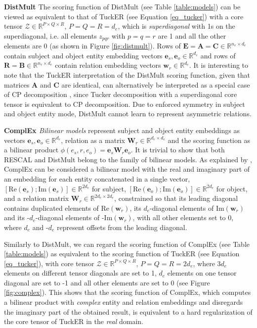 \documentclass[11pt,a4paper]{article}
\newcommand{\keypoint}[1]{\vspace{0.1cm}\noindent\textbf{#1}\quad}
\begin{document}
\keypoint{DistMult \cite{yang2014embedding}} The scoring function of DistMult (see Table \ref{table:models}) can be viewed as  equivalent to that of TuckER (see Equation \ref{eq_tucker}) with a core tensor $\mathcal{Z} \in \mathbb{R}^{P \times Q \times R}$, $P = Q = R = d_e$, which is \textit{superdiagonal} with 1s on the superdiagonal, i.e. all elements $z_{pqr}$ with $p=q=r$ are 1 and all the other elements are 0 (as shown in Figure \ref{fig:distmult}). Rows of $\mathbf{E} = \mathbf{A} = \mathbf{C} \in \mathbb{R}^{n_e \times d_e}$ contain subject and object entity embedding vectors $\mathbf{e}_s, \mathbf{e}_o \in \mathbb{R}^{d_e}$ and rows of $\mathbf{R} = \mathbf{B} \in \mathbb{R}^{n_r \times d_e}$ contain relation embedding vectors $\mathbf{w}_r \in \mathbb{R}^{d_e}$. It is interesting to note that the TuckER interpretation of the DistMult scoring function, given that matrices $\mathbf{A}$ and $\mathbf{C}$ are identical, can alternatively be interpreted as a special case of CP decomposition \cite{hitchcock1927expression}, since Tucker decomposition with a superdiagonal core tensor is equivalent to CP decomposition. Due to enforced symmetry in subject and object entity mode, DistMult cannot learn to represent asymmetric relations.

\keypoint{ComplEx \cite{trouillon2016complex}} \textit{Bilinear models} represent subject and object entity embeddings as vectors $\mathbf{e}_s, \mathbf{e}_o \in \mathbb{R}^{d_e}$, relation as a matrix $\mathbf{W}_r \in \mathbb{R}^{d_e \times d_e}$ and the scoring function as a bilinear product $\phi(e_s, r, e_o) = \mathbf{e}_s\mathbf{W}_r\mathbf{e}_o$. It is trivial to show that both RESCAL and DistMult belong to the family of bilinear models. As explained by \citet{kazemi2018simple}, ComplEx can be considered a bilinear model with the real and imaginary part of an embedding for each entity concatenated in a single vector, $[\text{Re}(\mathbf{e}_s); \text{Im}(\mathbf{e}_s)] \in \mathbb{R}^{2d_e}$ for subject, $[\text{Re}(\mathbf{e}_o); \text{Im}(\mathbf{e}_o)] \in \mathbb{R}^{2d_e}$ for object, and a relation matrix $\mathbf{W}_r \in \mathbb{R}^{2d_e \times 2d_e}$, constrained so that its leading diagonal contains duplicated elements of $\text{Re}(\mathbf{w}_r)$, its $d_e$-diagonal elements of $\text{Im}(\mathbf{w}_r)$ and its -$d_e$-diagonal elements of -$\text{Im}(\mathbf{w}_r)$, with all other elements set to 0, where $d_e$ and -$d_e$ represent offsets from the leading diagonal. 

Similarly to DistMult, we can regard the scoring function of ComplEx (see Table \ref{table:models}) as equivalent to the scoring function of TuckER (see Equation \ref{eq_tucker}), with core tensor $\mathcal{Z} \in \mathbb{R}^{P \times Q \times R}$, $P=Q=R=2d_e$, where $3d_e$ elements on different tensor diagonals are set to 1, $d_e$ elements on one tensor diagonal are set to -1 and all other elements are set to 0 (see Figure \ref{fig:complex}). This shows that the scoring function of ComplEx, which computes a bilinear product with \textit{complex} entity and relation embeddings and disregards the imaginary part of the obtained result, is equivalent to a hard regularization of the core tensor of TuckER in the \textit{real} domain.  
\end{document}
